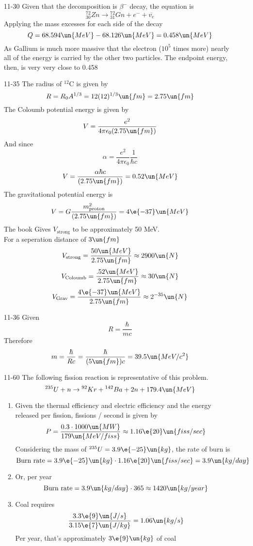 \documentclass{2620hw}
\begin{document}
\begin{enumerate}
\item[11-30] Given that the decomposition is $\beta^-$ decay, the equation is 
\[
	{}^{72}_{30}Zn \rightarrow {}^{72}_{31}Gn + e^- +  \overline{v_e}
\]
Applying the mass excesses for each side of the decay
\[
	Q = 68.594\un{MeV}-68.126\un{MeV} = 0.458\un{MeV}
\]
As Gallium is much more massive that the electron ($10^5$ times more) nearly all of the energy is carried by the other two particles. The endpoint energy, then, is very very close to 0.458

\item [11-35] The radius of ${}^{12}$C is given by 
\[
	R = R_0A^{1/3} = 12 (12)^{1/3} \un{fm} = 2.75\un{fm}		
\]
The Coloumb potential energy is given by
\[
	V = \frac{e^2}{4\pi\epsilon_0 (2.75\un{fm})}	
\]
And since 
\[
	\alpha = \frac{e^2}{4\pi\epsilon_0} \frac{1}{\hbar c}
\]
\[
	V = \frac{\alpha\hbar c}{(2.75\un{fm})} = 0.52\un{MeV}
\]
The gravitational potential energy is
\[
	V = G \frac{m_{\text{proton}}^2}{(2.75\un{fm})} = 4\e{-37}\un{MeV}
\]
The book Gives $V_{\text{strong}}$ to be approximately 50 MeV.\\
For a seperation distance of $3 \un{fm}$
\[
	V_{\text{strong}} =  \frac{50\un{MeV}}{2.75\un{fm}} \approx 2900\un{N}
\]
\[
	V_{\text{Coloumb}} =  \frac{.52\un{MeV}}{2.75\un{fm}} \approx 30 \un{N}
\]
\[
	V_{\text{Grav}} =  \frac{4\e{-37}\un{MeV}}{2.75\un{fm}} \approx 2^{-35} \un{N}
\]

\item [11-36] Given 
\[
	R = \frac{\hbar }{mc}
\]
Therefore
\[
	m  = \frac{\hbar}{Rc} = \frac{\hbar}{(5\un{fm}) c} = 39.5 \un{MeV/c^2}
\]

\item [11-60] The following fission reaction is representative of this problem. 
\[
	{}^{235}U + n \rightarrow {}^{92}Kr + {}^{142}Ba + 2n + 179.4 \un{MeV}
\]
\begin{enumerate}
	\item Given the thermal efficiency and electric efficiency and the energy released per fission, fissions / second is given by 
	\[
		P = \frac{0.3 \cdot 1000\un{MW}}{179\un{MeV / fiss}} \approx 1.16 \e{20}\un{fiss/sec}
	\]
Considering the mass of ${}^{235}U = 3.9 \e{-25}\un{kg}$, the rate of burn is
\[
	\text{Burn rate} = 3.9 \e{-25}\un{kg} \cdot 1.16 \e{20}\un{fiss/sec} =  3.9\un{kg/day}
\]
	\item Or, per year
	\[
		\text{Burn rate} = 	 3.9\un{kg/day} \cdot 365 \approx 1420 \un{kg/year}
	\]
	\item Coal requires
	\[
		\frac{3.3\e{9}\un{J/s}}{3.15\e{7}\un{J/kg}} = 1.06 \un{kg/s} 
	\]
	Per year, that's approximately $3\e{9}\un{kg}$ of coal


\end{enumerate}
\end{enumerate}
\end{document}
